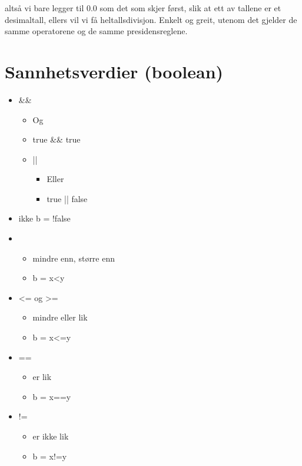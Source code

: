 \documentclass[11pt]{article}
\begin{document}
   altså vi bare legger til 0.0 som det som skjer først, slik at ett av tallene er
   et desimaltall, ellers vil vi få heltallsdivisjon. Enkelt og greit,
   utenom det gjelder de samme operatorene og de samme presidensreglene.
\section{Sannhetsverdier (boolean)}
\label{sec-2}


\begin{itemize}
\item \&\&

\begin{itemize}
\item Og
\item true \&\& true
\item ||

\begin{itemize}
\item Eller
\item true || false
\end{itemize}

\end{itemize}

\item ikke
       b = !false
\item < og >

\begin{itemize}
\item mindre enn, større enn
\item b = x<y
\end{itemize}

\item <= og >=

\begin{itemize}
\item mindre eller lik
\item b = x<=y
\end{itemize}

\item ==

\begin{itemize}
\item er lik
\item b = x==y
\end{itemize}

\item !=

\begin{itemize}
\item er ikke lik
\item b = x!=y
\end{itemize}

\end{itemize}
\end{document}
